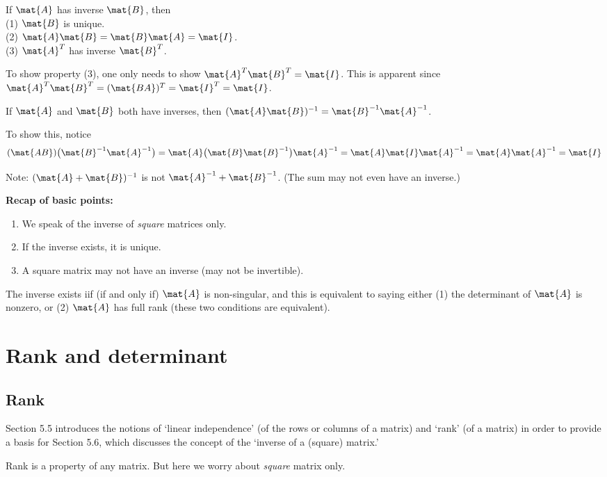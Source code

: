 \documentclass[12pt]{article}
\begin{document}
\alert[Proposition]%
If $\mat{A}$ has inverse $\mat{B}$, then\\
(1) $\mat{B}$ is unique.\\
(2) $\mat{A}\mat{B} = \mat{B}\mat{A} = \mat{I}$.\\
(3) $\mat{A}^T$ has inverse $\mat{B}^T$.

To show property (3), one only needs to show
$\mat{A}^T \mat{B}^T = \mat{I}$.
This is apparent since
$\mat{A}^T\mat{B}^T = (\mat{BA})^T = \mat{I}^T = \mat{I}$.

\alert[Proposition]%
If $\mat{A}$ and $\mat{B}$ both have inverses,
then $(\mat{A}\mat{B})^{-1} = \mat{B}^{-1}\mat{A}^{-1}$.

To show this, notice
\[
(\mat{AB}) \bigl(\mat{B}^{-1}\mat{A}^{-1}\bigr)
= \mat{A}\bigl(\mat{B}\mat{B}^{-1}\bigr)\mat{A}^{-1}
= \mat{A}\mat{I}\mat{A}^{-1}
= \mat{A}\mat{A}^{-1}
= \mat{I}
\]

Note: $(\mat{A} + \mat{B})^{-1}$ is not $\mat{A}^{-1} + \mat{B}^{-1}$.
(The sum may not even have an inverse.)

\textbf{Recap of basic points:}
\begin{enumerate}
\item We speak of the inverse of \emph{square} matrices only.
\item If the inverse exists, it is unique.
\item A square matrix may not have an inverse (may not be invertible).
\end{enumerate}

The inverse exists iif (if and only if)
$\mat{A}$ is non-singular,
and this is equivalent to saying either
(1) the determinant of $\mat{A}$ is nonzero,
or
(2) $\mat{A}$ has full rank
(these two conditions are equivalent).


\section{Rank and determinant}

\subsection{Rank}

Section 5.5 introduces the notions of `linear independence' (of the rows or
columns of a matrix) and `rank' (of a matrix) in order to provide a basis for
Section 5.6, which discusses the concept of the `inverse of a (square) matrix.'

Rank is a property of any matrix.
But here we worry about \emph{square} matrix only.
\end{document}
